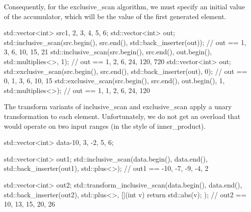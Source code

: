 Consequently, for the exclusive\_scan algorithm, we must specify an initial value of the accumulator, which will be the value of the first generated element.

\begin{box-note}
\begin{cppcode}
std::vector<int> src{1, 2, 3, 4, 5, 6};
{
    std::vector<int> out;
    std::inclusive_scan(src.begin(), src.end(), std::back_inserter(out));
    // out == {1, 3, 6, 10, 15, 21}
    std::inclusive_scan(src.begin(), src.end(), out.begin(), std::multiplies<>{}, 1);
    // out == {1, 2, 6, 24, 120, 720}
}
{
    std::vector<int> out;
    std::exclusive_scan(src.begin(), src.end(), std::back_inserter(out), 0);
    // out == {0, 1, 3, 6, 10, 15}
    std::exclusive_scan(src.begin(), src.end(), out.begin(), 1, std::multiplies<>{});
    // out == {1, 1, 2, 6, 24, 120}
}
\end{cppcode}
\end{box-note}



The transform variants of inclusive\_scan and exclusive\_scan apply a unary transformation to each element. Unfortunately, we do not get an overload that would operate on two input ranges (in the style of inner\_product).

\begin{box-note}
\begin{cppcode}
std::vector<int> data{-10, 3, -2, 5, 6};

std::vector<int> out1;
std::inclusive_scan(data.begin(), data.end(), std::back_inserter(out1), 
                    std::plus<>{});
// out1 == {-10, -7, -9, -4, 2}

std::vector<int> out2;
std::transform_inclusive_scan(data.begin(), data.end(), std::back_inserter(out2), 
                              std::plus<>{}, [](int v) { return std::abs(v); });
// out2 == {10, 13, 15, 20, 26}
\end{cppcode}
\end{box-note}

